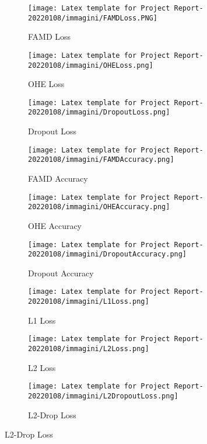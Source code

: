 \begin{figure}[h!]
     \centering
     \begin{subfigure}[b]{0.32\textwidth}
         \centering
         \texttt{[image: Latex template for Project Report-20220108/immagini/FAMDLoss.PNG]}
         \caption{FAMD Loss}
         \label{fig:FAMDLoss}
     \end{subfigure}
     \hfill
     \begin{subfigure}[b]{0.32\textwidth}
         \centering
         \texttt{[image: Latex template for Project Report-20220108/immagini/OHELoss.png]}
         \caption{OHE Loss}
         \label{fig:OHELoss}
     \end{subfigure}
     \hfill
     \begin{subfigure}[b]{0.32\textwidth}
         \centering
         \texttt{[image: Latex template for Project Report-20220108/immagini/DropoutLoss.png]}
         \caption{Dropout Loss}
         \label{fig:DropLoss}
     \end{subfigure}
     
     \begin{subfigure}[b]{0.32\textwidth}
         \centering
         \texttt{[image: Latex template for Project Report-20220108/immagini/FAMDAccuracy.png]}
         \caption{FAMD Accuracy}
         \label{fig:FAMDAcc}
     \end{subfigure}
     \hfill
     \begin{subfigure}[b]{0.32\textwidth}
         \centering
         \texttt{[image: Latex template for Project Report-20220108/immagini/OHEAccuracy.png]}
         \caption{OHE Accuracy}
         \label{fig:OHEAcc}
     \end{subfigure}
     \hfill
     \begin{subfigure}[b]{0.32\textwidth}
         \centering
         \texttt{[image: Latex template for Project Report-20220108/immagini/DropoutAccuracy.png]}
         \caption{Dropout Accuracy}
         \label{fig:DropAcc}
     \end{subfigure}
     
     \begin{subfigure}[b]{0.32\textwidth}
         \centering
         \texttt{[image: Latex template for Project Report-20220108/immagini/L1Loss.png]}
         \caption{L1 Loss}
         \label{fig:L1Loss}
     \end{subfigure}
     \hfill
     \begin{subfigure}[b]{0.32\textwidth}
         \centering
         \texttt{[image: Latex template for Project Report-20220108/immagini/L2Loss.png]}
         \caption{L2 Loss}
         \label{fig:L2Loss}
     \end{subfigure}
     \hfill
     \begin{subfigure}[b]{0.32\textwidth}
         \centering
         \texttt{[image: Latex template for Project Report-20220108/immagini/L2DropoutLoss.png]}
         \caption{L2-Drop Loss}
         \label{fig:L2DropLoss}
     \end{subfigure}
     

\end{figure}
